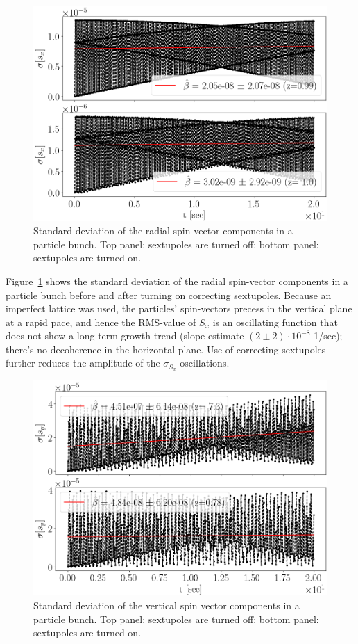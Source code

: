 \documentclass[a4paper]{jacow}
\begin{document}
\begin{figure}[ht]
  \centering
  \includegraphics[width=\linewidth]{../img/IPAC19/SX_decoh_20sec_both}
  \caption{Standard deviation of the radial spin vector components in a particle bunch.
    Top panel: sextupoles are turned off; bottom panel: sextupoles are turned on.\label{fig:decoh_rms_sx}}
\end{figure}

Figure~\ref{fig:decoh_rms_sx} shows the standard deviation of the radial spin-vector components in a particle bunch before and after turning on correcting sextupoles. Because an imperfect lattice was used, the particles' spin-vectors precess in the vertical plane at a rapid pace, and hence the RMS-value of $S_x$ is an oscillating function that does not show a long-term growth trend (slope estimate $(2 \pm 2)\cdot 10^{-8}$ 1/sec); there's no decoherence in the horizontal plane. Use of correcting sextupoles further reduces the amplitude of the $\sigma_{S_x}$-oscillations.

\begin{figure}[ht]
  \centering
  \includegraphics[width=\linewidth]{../img/IPAC19/SY_decoh_20sec_both}
  \caption{Standard deviation of the vertical spin vector components in a particle bunch.
    Top panel: sextupoles are turned off; bottom panel: sextupoles are turned on.\label{fig:decoh_rms_sy}}
\end{figure}
\end{document}
